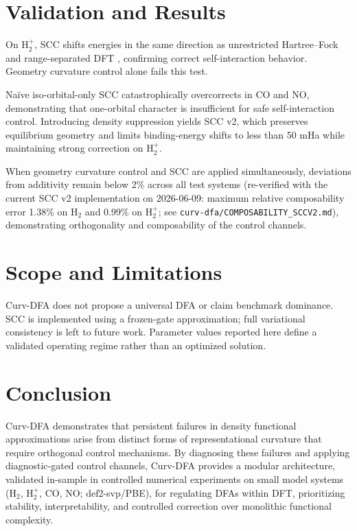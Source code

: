 \documentclass[11pt]{article}
\begin{document}
\section{Validation and Results}

On H$_2^+$, SCC shifts energies in the same direction as unrestricted Hartree--Fock and range-separated DFT \cite{HeydScuseriaErnzerhof,LCwPBE}, confirming correct self-interaction behavior. Geometry curvature control alone fails this test.

Na\"ive iso-orbital-only SCC catastrophically overcorrects in CO and NO, demonstrating that one-orbital character is insufficient for safe self-interaction control. Introducing density suppression yields SCC v2, which preserves equilibrium geometry and limits binding-energy shifts to less than 50 mHa while maintaining strong correction on H$_2^+$.

When geometry curvature control and SCC are applied simultaneously, deviations from additivity remain below 2\% across all test systems (re-verified with the current SCC v2 implementation on 2026-06-09: maximum relative composability error 1.38\% on H$_2$ and 0.99\% on H$_2^+$; see \texttt{curv-dfa/COMPOSABILITY\_SCCV2.md}), demonstrating orthogonality and composability of the control channels.

\section{Scope and Limitations}

Curv-DFA does not propose a universal DFA or claim benchmark dominance. SCC is implemented using a frozen-gate approximation; full variational consistency is left to future work. Parameter values reported here define a validated operating regime rather than an optimized solution.

\section{Conclusion}

Curv-DFA demonstrates that persistent failures in density functional approximations arise from distinct forms of representational curvature that require orthogonal control mechanisms. By diagnosing these failures and applying diagnostic-gated control channels, Curv-DFA provides a modular architecture, validated in-sample in controlled numerical experiments on small model systems (H$_2$, H$_2^+$, CO, NO; def2-svp/PBE), for regulating DFAs within DFT, prioritizing stability, interpretability, and controlled correction over monolithic functional complexity.
\end{document}
